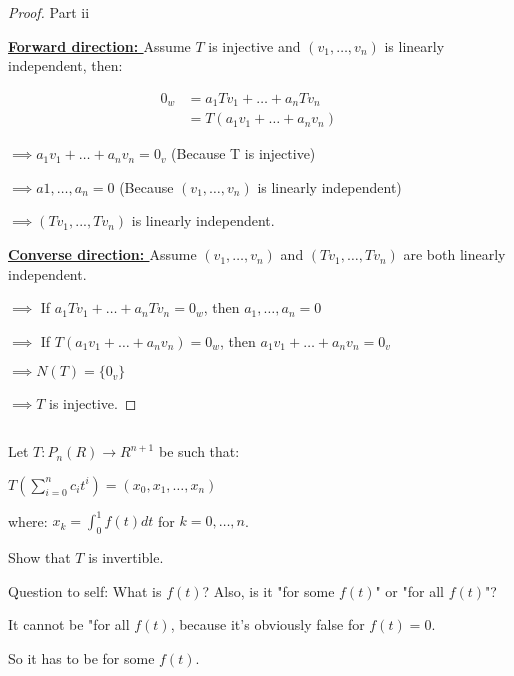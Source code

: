 \documentclass{article}
\newenvironment{customthm}[1]
  {\renewcommand\theinnercustomthm{#1}\innercustomthm}
  {\endinnercustomthm}
\begin{document}
\begin{proof}{Part ii}
  $ $

  \textbf{\underline{Forward direction: }} Assume $T$ is injective and $(v_1,\ldots, v_n)$ is linearly independent, then:

  \begin{align*}
    0_w &= a_1Tv_1 + \ldots + a_n Tv_n &&\\
    &= T(a_1v_1 + \ldots + a_nv_n)
  \end{align*}

  \noindent
  $\implies a_1v_1 + \ldots + a_nv_n = 0_v$ \qquad (Because T is injective)

  \noindent
  $\implies a1,\ldots,a_n = 0$ \qquad (Because $(v_1, \ldots, v_n)$ is linearly independent)

  \noindent
  $\implies (Tv_1,...,Tv_n)$ is linearly independent.

  \textbf{\underline{Converse direction: }} Assume $(v_1,\ldots,v_n)$ and $(Tv_1,\ldots,Tv_n)$ are both linearly independent.

  \noindent
  $\implies$ If $a_1Tv_1 + \ldots + a_nTv_n = 0_w$, then $a_1,\ldots,a_n = 0$

  \noindent
  $\implies$ If $T(a_1v_1+\ldots+a_nv_n) = 0_w$, then $a_1v_1 + \ldots + a_nv_n = 0_v$

  \noindent
  $\implies N(T) = \{ 0_v \}$

  \noindent
  $\implies T$ is injective.

\end{proof}
\newpage

\begin{customthm}{7}[2023.S(2.A)]
  $ $

  Let $T: P_n(R) \rightarrow R^{n+1}$ be such that:

  \qquad $T(\sum_{i=0}^{n} c_it^i) = (x_0, x_1,\ldots, x_n)$

  where: $x_k = \int_{0}^{1}f(t)dt$ \qquad for $k = 0,\ldots,n$.
  \newline
  
  Show that $T$ is invertible.
  \newline

  Question to self: What is $f(t)$? Also, is it "for some $f(t)$" or "for all $f(t)$"?

  It cannot be "for all $f(t)$, because it's obviously false for $f(t)=0$.

  So it has to be for some $f(t)$.

\end{customthm}
\end{document}
